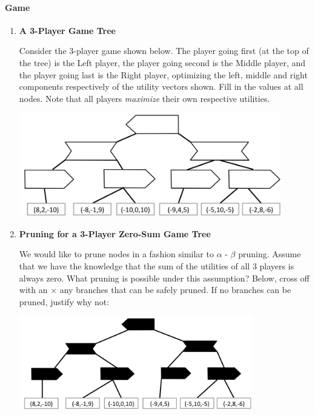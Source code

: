 \paragraph{Game}

\begin{enumerate}

\item {\bf A 3-Player Game Tree} 

Consider the 3-player game shown below.  The player going first (at the top
of the tree) is the Left player, the player going second is the Middle
player, and the player going last is the Right player, optimizing the
left, middle and right components respectively of the utility vectors shown.   Fill in the
values at all nodes.  Note that all players \emph{maximize} their
own respective utilities.

\begin{center}
    \includegraphics[width=4.5in]{figures/abg_q}
\end{center}

\vspace{1cm}


\item {\bf Pruning for a 3-Player Zero-Sum Game Tree}

We would like to prune nodes in a fashion similar to $\alpha$ - $\beta$ pruning.  Assume that we have the knowledge that the sum of the utilities of all 3 players is always zero.
What pruning is possible under this assumption?  Below, cross off with an $\times$ any branches that can be safely pruned.   If no branches can be pruned, justify why not:

\begin{center}
    \includegraphics[width=4in]{figures/skeleton}
\end{center}


\end{enumerate}
